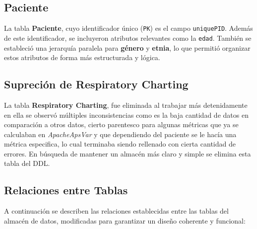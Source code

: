 \documentclass[12pt, a4paper, twoside]{article}
\begin{document}
	\subsection{Paciente}
	La tabla \textbf{Paciente}, cuyo identificador único (\texttt{PK}) es el campo \texttt{uniquePID}. Además de este identificador, se incluyeron atributos relevantes como la \texttt{edad}. También se estableció una jerarquía paralela para \textbf{género} y \textbf{etnia}, lo que permitió organizar estos atributos de forma más estructurada y lógica.
	
	\subsection{Supreción de Respiratory Charting}
	La tabla \textbf{Respiratory Charting}, fue eliminada al trabajar más detenidamente en ella se observó múltiples inconsistencias como es la baja cantidad de datos en comparación a otros datos, cierto parentesco para algunas métricas que ya se calculaban en \textit{ApacheApsVar} y que dependiendo del paciente se le hacía una métrica especifica, lo cual terminaba siendo rellenado con cierta cantidad de errores. En búsqueda de mantener un almacén más claro y simple se elimina esta tabla del DDL.
	
	\subsection{Relaciones entre Tablas}
	A continuación se describen las relaciones establecidas entre las tablas del almacén de datos, modificadas para garantizar un diseño coherente y funcional:
	
\end{document}
